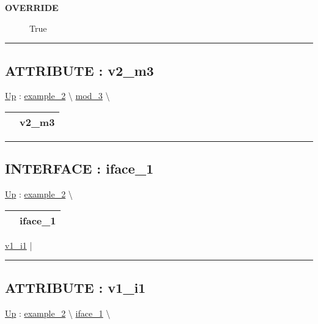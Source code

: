 \par

\par
\begin{description}
\item [\textbf{OVERRIDE}] True
\end{description}

\rule{\linewidth}{0.5pt}
\subsection*{ATTRIBUTE : v2\_m3}
\hypertarget{ecldoc:intest.example_2.mod_3.v2_m3}{}
\hyperlink{ecldoc:intest.example_2.mod_3}{Up} :
\hspace{0pt} \hyperlink{ecldoc:intest.example_2}{example_2} \textbackslash 
\hspace{0pt} \hyperlink{ecldoc:intest.example_2.mod_3}{mod_3} \textbackslash 

{\renewcommand{\arraystretch}{1.5}
\begin{tabularx}{\textwidth}{|>{\raggedright\arraybackslash}l|X|}
\hline
\hspace{0pt} & v2\_m3 \\
\hline
\end{tabularx}
}

\par


\rule{\linewidth}{0.5pt}


\subsection*{INTERFACE : iface\_1}
\hypertarget{ecldoc:intest.example_2.iface_1}{}
\hyperlink{ecldoc:intest.example_2}{Up} :
\hspace{0pt} \hyperlink{ecldoc:intest.example_2}{example_2} \textbackslash 

{\renewcommand{\arraystretch}{1.5}
\begin{tabularx}{\textwidth}{|>{\raggedright\arraybackslash}l|X|}
\hline
\hspace{0pt} & iface\_1 \\
\hline
\end{tabularx}
}

\par


\hyperlink{ecldoc:intest.example_2.iface_1.v1_i1}{v1\_i1}  |

\rule{\linewidth}{0.5pt}

\subsection*{ATTRIBUTE : v1\_i1}
\hypertarget{ecldoc:intest.example_2.iface_1.v1_i1}{}
\hyperlink{ecldoc:intest.example_2.iface_1}{Up} :
\hspace{0pt} \hyperlink{ecldoc:intest.example_2}{example_2} \textbackslash 
\hspace{0pt} \hyperlink{ecldoc:intest.example_2.iface_1}{iface_1} \textbackslash 

